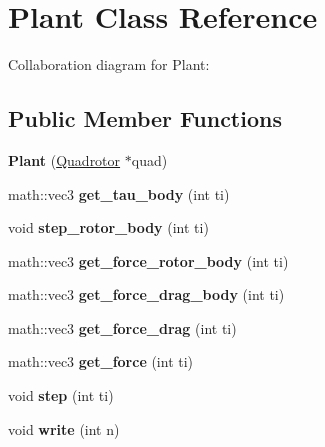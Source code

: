 \hypertarget{classPlant}{
\section{Plant Class Reference}
\label{classPlant}
}
Collaboration diagram for Plant:\subsection*{Public Member Functions}
\begin{DoxyCompactItemize}
\item 
\hypertarget{classPlant_a142ca8e3ae860d3b93f5de973be71e39}{
{\bfseries Plant} (\hyperlink{classQuadrotor}{Quadrotor} $\ast$quad)}
\label{classPlant_a142ca8e3ae860d3b93f5de973be71e39}

\item 
\hypertarget{classPlant_a9b61938a3973f7dc3bd2511bcb377615}{
math::vec3 {\bfseries get\_\-tau\_\-body} (int ti)}
\label{classPlant_a9b61938a3973f7dc3bd2511bcb377615}

\item 
\hypertarget{classPlant_a0cd2196cba6ec3725c7d3c9146ae2f3c}{
void {\bfseries step\_\-rotor\_\-body} (int ti)}
\label{classPlant_a0cd2196cba6ec3725c7d3c9146ae2f3c}

\item 
\hypertarget{classPlant_a0aec8e6b4599646841cbf16370e8726c}{
math::vec3 {\bfseries get\_\-force\_\-rotor\_\-body} (int ti)}
\label{classPlant_a0aec8e6b4599646841cbf16370e8726c}

\item 
\hypertarget{classPlant_a103c83a20c439d3944f14fca3aa42cd1}{
math::vec3 {\bfseries get\_\-force\_\-drag\_\-body} (int ti)}
\label{classPlant_a103c83a20c439d3944f14fca3aa42cd1}

\item 
\hypertarget{classPlant_a5d36154e55ed37ade1997289fe6dbdf9}{
math::vec3 {\bfseries get\_\-force\_\-drag} (int ti)}
\label{classPlant_a5d36154e55ed37ade1997289fe6dbdf9}

\item 
\hypertarget{classPlant_a992691a9ab2614199f2295dc825d583b}{
math::vec3 {\bfseries get\_\-force} (int ti)}
\label{classPlant_a992691a9ab2614199f2295dc825d583b}

\item 
\hypertarget{classPlant_af5c6f03354c0cf11a968e88381fe89ab}{
void {\bfseries step} (int ti)}
\label{classPlant_af5c6f03354c0cf11a968e88381fe89ab}

\item 
\hypertarget{classPlant_a59da9eafd398a9230723c13096a958cb}{
void {\bfseries write} (int n)}
\label{classPlant_a59da9eafd398a9230723c13096a958cb}

\end{DoxyCompactItemize}
